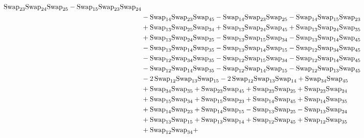 \documentclass[12pt,dvipsnames,accepted=2016-08-18,a4paper,onecolumn]{quantumarticle}
\numberwithin{equation}{section}
\theoremstyle{definition}
\begin{document}
\begin{align*}
        \textnormal{Swap}_{23} \textnormal{Swap}_{24} \textnormal{Swap}_{25} - \textnormal{Swap}_{15} \textnormal{Swap}_{23} \textnormal{Swap}_{24}\\ & - \textnormal{Swap}_{14} \textnormal{Swap}_{23} \textnormal{Swap}_{45} - \textnormal{Swap}_{14} \textnormal{Swap}_{23} \textnormal{Swap}_{25} - \textnormal{Swap}_{14} \textnormal{Swap}_{15} \textnormal{Swap}_{23}\\ & +
        \textnormal{Swap}_{13} \textnormal{Swap}_{25} \textnormal{Swap}_{34} + \textnormal{Swap}_{13} \textnormal{Swap}_{24} \textnormal{Swap}_{45} + \textnormal{Swap}_{13} \textnormal{Swap}_{24} \textnormal{Swap}_{35}\\ & + \textnormal{Swap}_{13} \textnormal{Swap}_{24} \textnormal{Swap}_{25} - \textnormal{Swap}_{13} \textnormal{Swap}_{15} \textnormal{Swap}_{34} -
        \textnormal{Swap}_{13} \textnormal{Swap}_{14} \textnormal{Swap}_{45}\\ & - \textnormal{Swap}_{13} \textnormal{Swap}_{14} \textnormal{Swap}_{35} - \textnormal{Swap}_{13} \textnormal{Swap}_{14} \textnormal{Swap}_{15} - \textnormal{Swap}_{12} \textnormal{Swap}_{34} \textnormal{Swap}_{45}\\ & - \textnormal{Swap}_{12} \textnormal{Swap}_{34} \textnormal{Swap}_{35} -
        \textnormal{Swap}_{12} \textnormal{Swap}_{15} \textnormal{Swap}_{34} - \textnormal{Swap}_{12} \textnormal{Swap}_{14} \textnormal{Swap}_{45}\\ & - \textnormal{Swap}_{12} \textnormal{Swap}_{14} \textnormal{Swap}_{35} - \textnormal{Swap}_{12} \textnormal{Swap}_{14} \textnormal{Swap}_{15} - \textnormal{Swap}_{12} \textnormal{Swap}_{13} \textnormal{Swap}_{45}\\ & -
        2\,\textnormal{Swap}_{12} \textnormal{Swap}_{13} \textnormal{Swap}_{15} - 2\,\textnormal{Swap}_{12} \textnormal{Swap}_{13} \textnormal{Swap}_{14} + \textnormal{Swap}_{34} \textnormal{Swap}_{45}\\ & + \textnormal{Swap}_{34} \textnormal{Swap}_{35} + \textnormal{Swap}_{23} \textnormal{Swap}_{45} + \textnormal{Swap}_{23} \textnormal{Swap}_{25} +
        \textnormal{Swap}_{23} \textnormal{Swap}_{24}\\ & + \textnormal{Swap}_{15} \textnormal{Swap}_{34} + \textnormal{Swap}_{15} \textnormal{Swap}_{23} + \textnormal{Swap}_{14} \textnormal{Swap}_{45} + \textnormal{Swap}_{14} \textnormal{Swap}_{35}\\ & + \textnormal{Swap}_{14} \textnormal{Swap}_{23} + \textnormal{Swap}_{14} \textnormal{Swap}_{15} -
        \textnormal{Swap}_{13} \textnormal{Swap}_{25} - \textnormal{Swap}_{13} \textnormal{Swap}_{24}\\ & + \textnormal{Swap}_{13} \textnormal{Swap}_{15} + \textnormal{Swap}_{13} \textnormal{Swap}_{14} + \textnormal{Swap}_{12} \textnormal{Swap}_{45} + \textnormal{Swap}_{12} \textnormal{Swap}_{35}\\ & + \textnormal{Swap}_{12} \textnormal{Swap}_{34} +

\end{align*}
\end{document}
